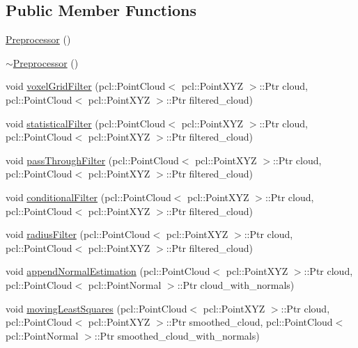 \subsection*{Public Member Functions}
\begin{DoxyCompactItemize}
\item 
\hyperlink{classhull__abstraction_1_1_preprocessor_aa1e7b3418d273ceddd2faa0777f3598c}{Preprocessor} ()
\item 
\hyperlink{classhull__abstraction_1_1_preprocessor_a880dfe2a68232c6aea2ad41743df3d97}{$\sim$\+Preprocessor} ()
\item 
void \hyperlink{classhull__abstraction_1_1_preprocessor_a423d6c8cb5b08f8387290aae47184b3b}{voxel\+Grid\+Filter} (pcl\+::\+Point\+Cloud$<$ pcl\+::\+Point\+X\+YZ $>$\+::Ptr cloud, pcl\+::\+Point\+Cloud$<$ pcl\+::\+Point\+X\+YZ $>$\+::Ptr filtered\+\_\+cloud)
\item 
void \hyperlink{classhull__abstraction_1_1_preprocessor_a494877684eca0eaf7207c8655140b692}{statistical\+Filter} (pcl\+::\+Point\+Cloud$<$ pcl\+::\+Point\+X\+YZ $>$\+::Ptr cloud, pcl\+::\+Point\+Cloud$<$ pcl\+::\+Point\+X\+YZ $>$\+::Ptr filtered\+\_\+cloud)
\item 
void \hyperlink{classhull__abstraction_1_1_preprocessor_a4912126b50bdac35c63f521e3bc04314}{pass\+Through\+Filter} (pcl\+::\+Point\+Cloud$<$ pcl\+::\+Point\+X\+YZ $>$\+::Ptr cloud, pcl\+::\+Point\+Cloud$<$ pcl\+::\+Point\+X\+YZ $>$\+::Ptr filtered\+\_\+cloud)
\item 
void \hyperlink{classhull__abstraction_1_1_preprocessor_a95229af873f6f1a74c832340f8f9b7bf}{conditional\+Filter} (pcl\+::\+Point\+Cloud$<$ pcl\+::\+Point\+X\+YZ $>$\+::Ptr cloud, pcl\+::\+Point\+Cloud$<$ pcl\+::\+Point\+X\+YZ $>$\+::Ptr filtered\+\_\+cloud)
\item 
void \hyperlink{classhull__abstraction_1_1_preprocessor_aef6ccdc23a770af04eb6fc1d34aceff9}{radius\+Filter} (pcl\+::\+Point\+Cloud$<$ pcl\+::\+Point\+X\+YZ $>$\+::Ptr cloud, pcl\+::\+Point\+Cloud$<$ pcl\+::\+Point\+X\+YZ $>$\+::Ptr filtered\+\_\+cloud)
\item 
void \hyperlink{classhull__abstraction_1_1_preprocessor_a9768f4de4320607118636323343b5b5c}{append\+Normal\+Estimation} (pcl\+::\+Point\+Cloud$<$ pcl\+::\+Point\+X\+YZ $>$\+::Ptr cloud, pcl\+::\+Point\+Cloud$<$ pcl\+::\+Point\+Normal $>$\+::Ptr cloud\+\_\+with\+\_\+normals)
\item 
void \hyperlink{classhull__abstraction_1_1_preprocessor_adb771d9dfac554a7dd35db7d9acc3ca3}{moving\+Least\+Squares} (pcl\+::\+Point\+Cloud$<$ pcl\+::\+Point\+X\+YZ $>$\+::Ptr cloud, pcl\+::\+Point\+Cloud$<$ pcl\+::\+Point\+X\+YZ $>$\+::Ptr smoothed\+\_\+cloud, pcl\+::\+Point\+Cloud$<$ pcl\+::\+Point\+Normal $>$\+::Ptr smoothed\+\_\+cloud\+\_\+with\+\_\+normals)

\end{DoxyCompactItemize}
